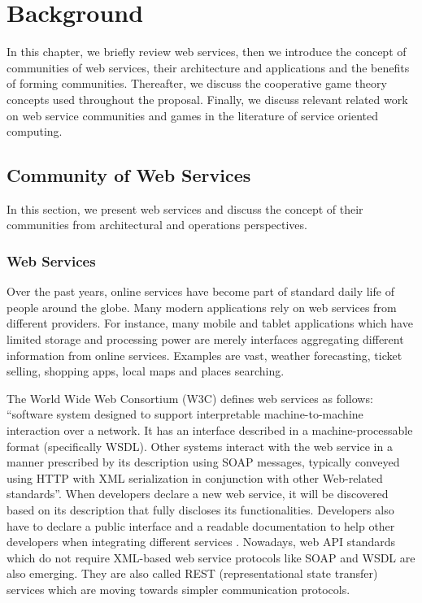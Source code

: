 \setcounter{chapter}{1}

\chapter{Background}\label{cha:background}
In this chapter, we briefly review web services, then we introduce
the concept of communities of web services, their architecture and
applications and the benefits of forming communities. Thereafter,
we discuss the cooperative game theory concepts used throughout
the proposal. Finally, we discuss relevant related work on web
service communities and games in the literature of service
oriented computing.

\section{Community of Web Services}\label{sec:CommunityWS}
In this section, we present web services and discuss the concept
of their communities from architectural and operations
perspectives.

\subsection{Web Services}\label{sec:CWSWebServices}
Over the past years, online services have become part of standard
daily life of people around the globe. Many modern applications
rely on web services from different providers. For instance, many
mobile and tablet applications which have limited storage and
processing power are merely interfaces aggregating different
information from online services. Examples are vast, weather
forecasting, ticket selling, shopping apps, local maps and places
searching.

The World Wide Web Consortium (W3C) defines web services as
follows: ``software system designed to support interpretable
machine-to-machine interaction over a network. It has an interface
described in a machine-processable format (specifically WSDL).
Other systems interact with the web service in a manner prescribed
by its description using SOAP messages, typically conveyed using
HTTP with XML serialization in conjunction with other Web-related
standards''. When developers declare a new web service, it will be
discovered based on its description that fully discloses its
functionalities. Developers also have to declare a public
interface and a readable documentation to help other developers
when integrating different services \cite{w3cwsdl}. Nowadays, web
API standards which do not require XML-based web service protocols
like SOAP and WSDL are also emerging. They are also called REST
(representational state transfer) services which are moving
towards simpler communication protocols. %

